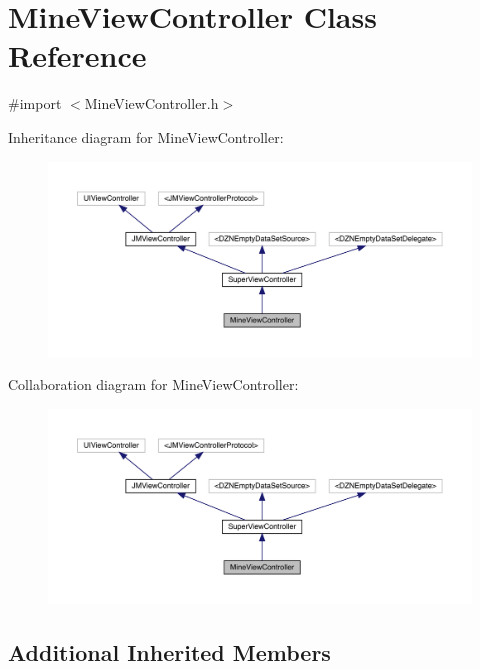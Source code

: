 \hypertarget{interface_mine_view_controller}{}\section{Mine\+View\+Controller Class Reference}
\label{interface_mine_view_controller}


{\ttfamily \#import $<$Mine\+View\+Controller.\+h$>$}



Inheritance diagram for Mine\+View\+Controller\+:\nopagebreak
\begin{figure}[H]
\begin{center}
\leavevmode
\includegraphics[width=350pt]{interface_mine_view_controller__inherit__graph}
\end{center}
\end{figure}


Collaboration diagram for Mine\+View\+Controller\+:\nopagebreak
\begin{figure}[H]
\begin{center}
\leavevmode
\includegraphics[width=350pt]{interface_mine_view_controller__coll__graph}
\end{center}
\end{figure}
\subsection*{Additional Inherited Members}


